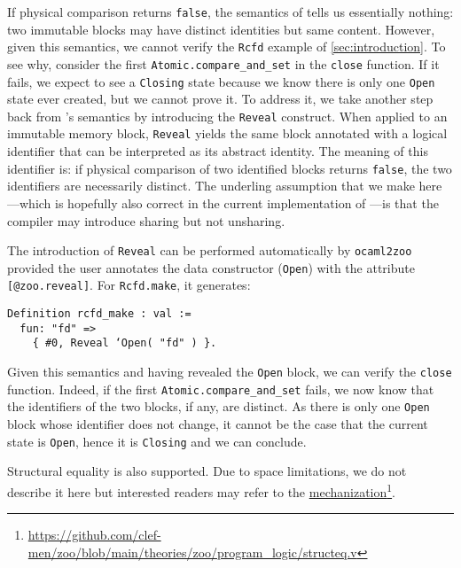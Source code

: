 If physical comparison returns \texttt{false}, the semantics of \OCaml tells us essentially nothing: two immutable blocks may have distinct identities but same content.
However, given this semantics, we cannot verify the \texttt{Rcfd} example of \cref{sec:introduction}.
To see why, consider the first \texttt{Atomic.compare_and_set} in the \texttt{close} function.
If it fails, we expect to see a \texttt{Closing} state because we know there is only one \texttt{Open} state ever created, but we cannot prove it.
To address it, we take another step back from \OCaml's semantics by introducing the \texttt{Reveal} construct.
When applied to an immutable memory block, \texttt{Reveal} yields the same block annotated with a logical identifier that can be interpreted as its abstract identity.
The meaning of this identifier is: if physical comparison of two identified blocks returns \texttt{false}, the two identifiers are necessarily distinct.
The underling assumption that we make here---which is hopefully also correct in the current implementation of \OCaml---is that the compiler may introduce sharing but not unsharing.

The introduction of \texttt{Reveal} can be performed automatically by \texttt{ocaml2zoo} provided the user annotates the data constructor (\eg \texttt{Open}) with the attribute \texttt{[@zoo.reveal]}.
For \texttt{Rcfd.make}, it generates:

\begin{verbatim}
Definition rcfd_make : val :=
  fun: "fd" =>
    { #0, Reveal ‘Open( "fd" ) }.
\end{verbatim}

Given this semantics and having revealed the \texttt{Open} block, we can verify the \texttt{close} function.
Indeed, if the first \texttt{Atomic.compare_and_set} fails, we now know that the identifiers of the two blocks, if any, are distinct.
As there is only one \texttt{Open} block whose identifier does not change, it cannot be the case that the current state is \texttt{Open}, hence it is \texttt{Closing} and we can conclude.

Structural equality is also supported.
Due to space limitations, we do not describe it here but interested readers may refer to the \Rocq \href{https://github.com/clef-men/zoo/blob/main/theories/zoo/program_logic/structeq.v}{mechanization}\footnote{\url{https://github.com/clef-men/zoo/blob/main/theories/zoo/program\_logic/structeq.v}}.

